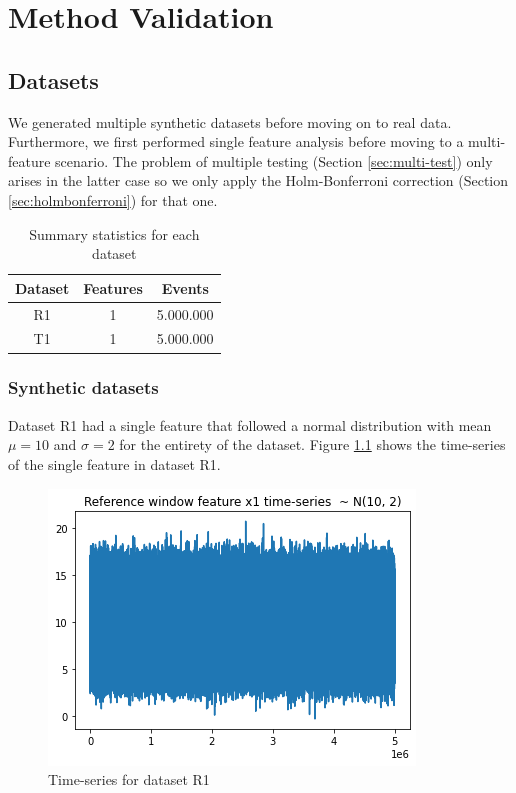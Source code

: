 \chapter{Method Validation} \label{chap:validation} \minitoc

\section{Datasets}

We generated multiple synthetic datasets before moving on to real data. Furthermore, we first performed single feature analysis before moving to a multi-feature scenario. The problem of multiple testing (Section \ref{sec:multi-test}) only arises in the latter case so we only apply the Holm-Bonferroni correction (Section \ref{sec:holmbonferroni}) for that one.


\begin{table}[!htb]
    \begin{center}
        \begin{tabular}{|c|c|c|}
        \hline
        \textbf{Dataset} & \textbf{Features} & \textbf{Events} \\ \hline
        R1               & 1                 & 5.000.000       \\ \hline
        T1               & 1                 & 5.000.000       \\ \hline
        
        \end{tabular}
    \end{center}
    \caption{Summary statistics for each dataset}
    \label{tbl:summary-statistics}
\end{table}

\subsection{Synthetic datasets}
Dataset R1 had a single feature that followed a normal distribution with mean $\mu=10$ and $\sigma=2$ for the entirety of the dataset. Figure \ref{fig:timeseries-r1} shows the time-series of the single feature in dataset R1.

\begin{figure}[!htb]
    \begin{center}
      \includegraphics[scale=0.6]{figures/01-reference.png}
      \caption[]{Time-series for dataset R1}
      \label{fig:timeseries-r1}
    \end{center}
\end{figure}



